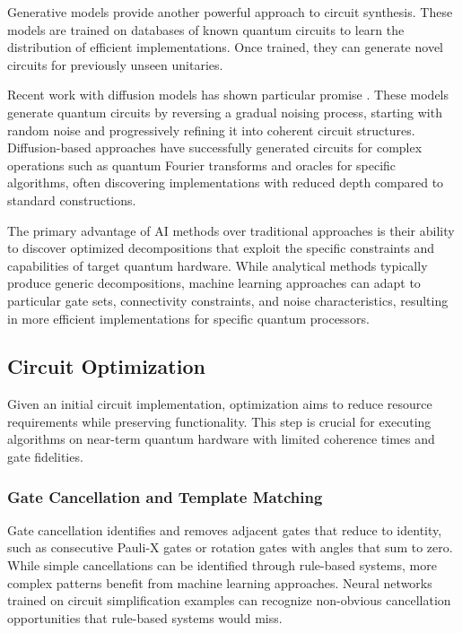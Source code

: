 Generative models provide another powerful approach to circuit synthesis. These models are trained on databases of known quantum circuits to learn the distribution of efficient implementations. Once trained, they can generate novel circuits for previously unseen unitaries.

Recent work with diffusion models has shown particular promise \cite{furrutter2024quantum}. These models generate quantum circuits by reversing a gradual noising process, starting with random noise and progressively refining it into coherent circuit structures. Diffusion-based approaches have successfully generated circuits for complex operations such as quantum Fourier transforms and oracles for specific algorithms, often discovering implementations with reduced depth compared to standard constructions.

The primary advantage of AI methods over traditional approaches is their ability to discover optimized decompositions that exploit the specific constraints and capabilities of target quantum hardware. While analytical methods typically produce generic decompositions, machine learning approaches can adapt to particular gate sets, connectivity constraints, and noise characteristics, resulting in more efficient implementations for specific quantum processors.

\subsection{Circuit Optimization}

Given an initial circuit implementation, optimization aims to reduce resource requirements while preserving functionality. This step is crucial for executing algorithms on near-term quantum hardware with limited coherence times and gate fidelities.

\subsubsection{Gate Cancellation and Template Matching}

Gate cancellation identifies and removes adjacent gates that reduce to identity, such as consecutive Pauli-X gates or rotation gates with angles that sum to zero. While simple cancellations can be identified through rule-based systems, more complex patterns benefit from machine learning approaches. Neural networks trained on circuit simplification examples can recognize non-obvious cancellation opportunities that rule-based systems would miss.

